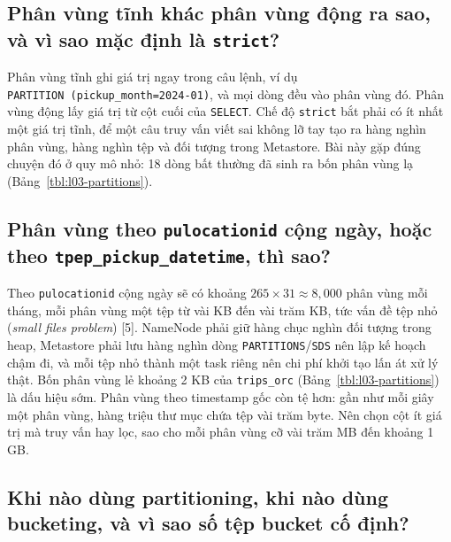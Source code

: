 \documentclass[
  12pt,
  a4paper,
]{report}
\begin{document}
\subsection{\texorpdfstring{Phân vùng tĩnh khác phân vùng động ra sao,
và vì sao mặc định là
\texttt{strict}?}{Phân vùng tĩnh khác phân vùng động ra sao, và vì sao mặc định là strict?}}\label{sec:l03-q5}

Phân vùng tĩnh ghi giá trị ngay trong câu lệnh, ví dụ
\texttt{PARTITION\ (pickup\_}\allowbreak{}\texttt{month=}\allowbreak{}\texttt{\textquotesingle{}2024-01\textquotesingle{})}\allowbreak{},
và mọi dòng đều vào phân vùng đó. Phân vùng động lấy giá trị từ cột cuối
của \texttt{SELECT}. Chế độ \texttt{strict} bắt phải có ít nhất một giá
trị tĩnh, để một câu truy vấn viết sai không lỡ tay tạo ra hàng nghìn
phân vùng, hàng nghìn tệp và đối tượng trong Metastore. Bài này gặp đúng
chuyện đó ở quy mô nhỏ: 18 dòng bất thường đã sinh ra bốn phân vùng lạ
(Bảng~\ref{tbl:l03-partitions}).

\subsection{\texorpdfstring{Phân vùng theo \texttt{pulocationid} cộng
ngày, hoặc theo
\texttt{tpep\_}\allowbreak{}\texttt{pickup\_}\allowbreak{}\texttt{datetime}\allowbreak{},
thì
sao?}{Phân vùng theo pulocationid cộng ngày, hoặc theo tpep\_pickup\_datetime, thì sao?}}\label{sec:l03-q6}

Theo \texttt{pulocationid} cộng ngày sẽ có khoảng
\(265 \times 31 \approx 8{,}000\) phân vùng mỗi tháng, mỗi phân vùng một
tệp từ vài KB đến vài trăm KB, tức vấn đề tệp nhỏ (\emph{small files
problem}) {[}5{]}. NameNode phải giữ hàng chục nghìn đối tượng trong
heap, Metastore phải lưu hàng nghìn dòng
\texttt{PARTITIONS}/\texttt{SDS} nên lập kế hoạch chậm đi, và mỗi tệp
nhỏ thành một task riêng nên chi phí khởi tạo lấn át xử lý thật. Bốn
phân vùng lẻ khoảng 2 KB của \texttt{trips\_orc}
(Bảng~\ref{tbl:l03-partitions}) là dấu hiệu sớm. Phân vùng theo
timestamp gốc còn tệ hơn: gần như mỗi giây một phân vùng, hàng triệu thư
mục chứa tệp vài trăm byte. Nên chọn cột ít giá trị mà truy vấn hay lọc,
sao cho mỗi phân vùng cỡ vài trăm MB đến khoảng 1 GB.

\subsection{Khi nào dùng partitioning, khi nào dùng bucketing, và vì sao
số tệp bucket cố định?}\label{sec:l03-q7}
\end{document}
